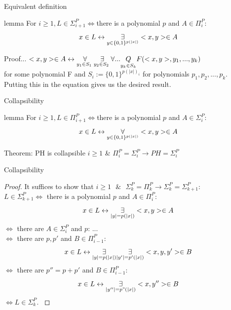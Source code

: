         \begin{frame}{Equivalent definition}
            \begin{block}{lemma}
                For $i\geq 1, L \in  \Sigma_{i+1}^P \iff $there is a polynomial $p$ and $A \in \Pi_i^P$:
                $$x \in L \leftrightarrow \overset{{}}{\underset{{y\in \{0,1\}^{p(|x|)}}}{\Large \exists}} <x,y> \in A$$
            \end{block}
            \pause
            \begin{block}{Proof...}
                $<x,y> \in A \leftrightarrow \overset{{}}{\underset{{y_1 \in S_1\text{ }}}{\Large \forall}}
                    \overset{{}}{\underset{{y_2 \in S_2\text{ }}}{\Large \exists}}
                    \forall ...\underset{y_k \in S_k}{Q} F(<x,y>,y_1,...,y_k)$\\
                for some polynomial F and $S_i := \{0,1\}^{p(|x|)_i}$ for polynomials $p_1,p_2,..., p_k$. Putting this in the equation gives us the desired result.
            \end{block}
        \end{frame}

        \begin{frame}{Collapsibility}
            \begin{block}{lemma}
                For $i\geq 1, L \in  \Pi_{i+1}^P \iff $there is a polynomial $p$ and $A \in \Sigma_i^P$:
                $$x \in L \leftrightarrow \overset{{}}{\underset{{y\in \{0,1\}^{p(|x|)}}}{\Large \forall}} <x,y> \in A$$
            \end{block}
            \pause
            \begin{block}{Theorem: PH is collapsible}            
                $i \geq 1 $ \& $ \Pi_i^P = \Sigma_i^P \to PH = \Sigma_i^P$
            \end{block}
        \end{frame}

        \begin{frame}{Collapsibility}
            \begin{proof}
                \small{
                It suffices to show that 
                $i\geq1 \text{ $\&$ } \Sigma_k^P = \Pi_k^P 
                \to \Sigma_k^P = \Sigma_{k+1}^P$:\\
                $L \in \Sigma_{k+1}^P \iff$ there is a polynomial $p$ and $A \in \Pi_i^P$:
                $$x \in L \leftrightarrow \overset{{}}{\underset{{|y|=p(|x|)}}{\Large \exists}} <x,y> \in A$$
                $\iff$ there are $A \in \Sigma_i^P$ and $p$:
                 $...$\\
                $\iff$ there are $p,p'$ and $B \in \Pi_{i-1}^P$:
                $$x \in L \leftrightarrow \overset{{}}{\underset{{|y|=p(|x|)}}{\Large \exists}} \overset{{}}{\underset{{|y'|=p'(|x|)}}{\Large \exists}} <x,y,y'> \in B$$
                $\iff$ there are $p'' = p+p'$ and $B \in \Pi_{i-1}^P$:
                $$x \in L \leftrightarrow \overset{{}}{\underset{{|y''|=p"(|x|)}}{\Large \exists}} <x,y''> \in B$$
                $\iff L \in \Sigma_k^P$.
                }
            \end{proof}
        \end{frame}
            

